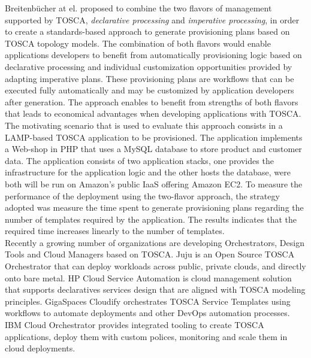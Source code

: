Breitenb\"{u}cher at el. \cite{breitenbucher2014combining} proposed to combine the two flavors of management supported by TOSCA, \textit{declarative processing} and
\textit{imperative processing}, in order to create a standards-based approach to generate provisioning plans based on TOSCA topology models. The
combination of both flavors would enable applications developers to benefit from automatically provisioning logic based on declarative processing and
individual customization opportunities provided by adapting imperative plans. These provisioning plans are workflows that can be executed fully automatically and
may be customized by application developers after generation. The approach enables to benefit from strengths of both flavors that leads to economical advantages
when developing applications with TOSCA. The motivating scenario that is used to evaluate this approach consists in a LAMP-based TOSCA application to be provisioned.
The application implements a Web-shop in PHP that uses a MySQL database to store product and customer data. The application consists of two application stacks, one provides
the infrastructure for the application logic and the other hosts the database, were both will be run on Amazon's public IaaS offering Amazon EC2. To measure the performance
of the deployment using the two-flavor approach, the strategy adopted was measure the time spent to generate provisioning plans regarding the number of templates required
by the application. The results indicates that the required time increases linearly to the number of templates.\\

Recently a growing number of organizations are developing Orchestrators, Design Tools and Cloud Managers based on TOSCA. Juju is an Open Source TOSCA Orchestrator that
can deploy workloads across public, private clouds, and directly onto bare metal. HP Cloud Service Automation is cloud management solution that supports declaratives
services design that are aligned with TOSCA modeling principles. GigaSpaces Cloudify orchestrates TOSCA Service Templates using workflows to automate deployments and other
DevOps automation processes. IBM Cloud Orchestrator provides integrated tooling to create TOSCA applications, deploy them with custom polices, monitoring and scale them in cloud deployments.\\

